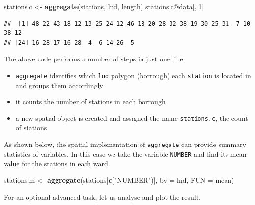 \documentclass[]{article}
\newenvironment{Shaded}{}{}
\newcommand{\KeywordTok}[1]{\textcolor[rgb]{0.00,0.44,0.13}{\textbf{{#1}}}}
\newcommand{\DataTypeTok}[1]{\textcolor[rgb]{0.56,0.13,0.00}{{#1}}}
\newcommand{\DecValTok}[1]{\textcolor[rgb]{0.25,0.63,0.44}{{#1}}}
\newcommand{\StringTok}[1]{\textcolor[rgb]{0.25,0.44,0.63}{{#1}}}
\newcommand{\NormalTok}[1]{{#1}}
\begin{document}
\begin{Shaded}
\begin{Highlighting}[]
\NormalTok{stations.c <- }\KeywordTok{aggregate}\NormalTok{(stations, lnd, length)}
\NormalTok{stations.c@data[, }\DecValTok{1}\NormalTok{]}
\end{Highlighting}
\end{Shaded}
\begin{verbatim}
##  [1] 48 22 43 18 12 13 25 24 12 46 18 20 28 32 38 19 30 25 31  7 10 38 12
## [24] 16 28 17 16 28  4  6 14 26  5
\end{verbatim}
The above code performs a number of steps in just one line:

\begin{itemize}
\item
  \texttt{aggregate} identifies which \texttt{lnd} polygon (borrough)
  each \texttt{station} is located in and groups them accordingly
\item
  it counts the number of stations in each borrough
\item
  a new spatial object is created and assigned the name
  \texttt{stations.c}, the count of stations
\end{itemize}
As shown below, the spatial implementation of \texttt{aggregate} can
provide summary statistics of variables. In this case we take the
variable \texttt{NUMBER} and find its mean value for the stations in
each ward.

\begin{Shaded}
\begin{Highlighting}[]
\NormalTok{stations.m <- }\KeywordTok{aggregate}\NormalTok{(stations[}\KeywordTok{c}\NormalTok{(}\StringTok{"NUMBER"}\NormalTok{)], }\DataTypeTok{by =} \NormalTok{lnd, }\DataTypeTok{FUN =} \NormalTok{mean)}
\end{Highlighting}
\end{Shaded}
For an optional advanced task, let us analyse and plot the result.
\end{document}
